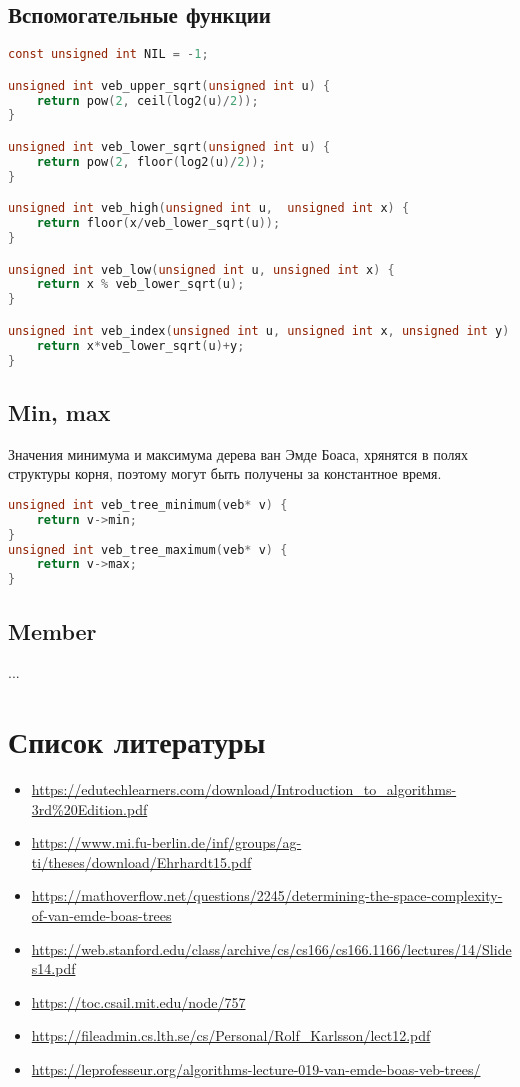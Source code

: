 \documentclass{article}
\begin{document}
\subsection{Вспомогательные функции}
\begin{lstlisting}[language=C,style=C]
const unsigned int NIL = -1;

unsigned int veb_upper_sqrt(unsigned int u) {
    return pow(2, ceil(log2(u)/2));
}

unsigned int veb_lower_sqrt(unsigned int u) {
    return pow(2, floor(log2(u)/2));
}

unsigned int veb_high(unsigned int u,  unsigned int x) {
    return floor(x/veb_lower_sqrt(u));
}

unsigned int veb_low(unsigned int u, unsigned int x) {
    return x % veb_lower_sqrt(u);
}

unsigned int veb_index(unsigned int u, unsigned int x, unsigned int y) {
    return x*veb_lower_sqrt(u)+y;
}
\end{lstlisting}
\subsection{Min, max}
Значения минимума и максимума дерева ван Эмде Боаса, хрянятся в полях структуры корня, поэтому могут быть получены за константное время.
\begin{lstlisting}[language=C,style=C]
unsigned int veb_tree_minimum(veb* v) {
    return v->min;
}
unsigned int veb_tree_maximum(veb* v) {
    return v->max;
}
\end{lstlisting}
\subsection{Member}
...
\section{Список литературы}
\begin{itemize}
    \item \url{https://edutechlearners.com/download/Introduction_to_algorithms-3rd\%20Edition.pdf}
    \item \url{https://www.mi.fu-berlin.de/inf/groups/ag-ti/theses/download/Ehrhardt15.pdf}
    \item \url{https://mathoverflow.net/questions/2245/determining-the-space-complexity-of-van-emde-boas-trees}
    \item \url{https://web.stanford.edu/class/archive/cs/cs166/cs166.1166/lectures/14/Slides14.pdf}
    \item \url{https://toc.csail.mit.edu/node/757}
    \item \url{https://fileadmin.cs.lth.se/cs/Personal/Rolf_Karlsson/lect12.pdf}
    \item \url{https://leprofesseur.org/algorithms-lecture-019-van-emde-boas-veb-trees/}
\end{itemize}
\end{document}
